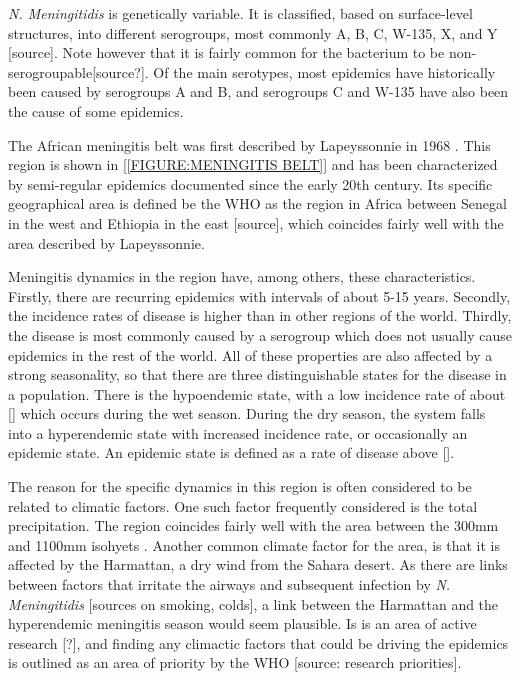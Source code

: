 \documentclass[10pt,a4paper]{article}
\begin{document}

\emph{N. Meningitidis} is genetically variable. It is classified, based on surface-level structures, into different serogroups, most commonly A, B, C, W-135, X, and Y [source]. Note however that it is fairly common for the bacterium to be non-serogroupable[source?]. Of the main serotypes, most epidemics have historically been caused by serogroups A and B, and serogroups C and W-135 have also been the cause of some epidemics. 


The African meningitis belt was first described by Lapeyssonnie in 1968 \cite{lapeyssonnie}. This region is shown in \cref{[FIGURE:MENINGITIS BELT]} and has been characterized by semi-regular epidemics documented since the early 20th century. Its specific geographical area is defined be the WHO as the region in Africa between Senegal in the west and Ethiopia in the east [source], which coincides fairly well with the area described by Lapeyssonnie.

Meningitis dynamics in the region have, among others, these characteristics. Firstly, there are recurring epidemics with intervals of about 5-15 years. Secondly, the incidence rates of disease is higher than in other regions of the world. Thirdly, the disease is most commonly caused by a serogroup which does not usually cause epidemics in the rest of the world. All of these properties are also affected by a strong seasonality, so that there are three distinguishable states for the disease in a population. There is the hypoendemic state, with a low incidence rate of about [] which occurs during the wet season. During the dry season, the system falls into a hyperendemic state with increased incidence rate, or occasionally an epidemic state. An epidemic state is defined as a rate of disease above []. \cite{mueller2010hypothetical}

The reason for the specific dynamics in this region is often considered to be related to climatic factors. One such factor frequently considered is the total precipitation. The region coincides fairly well with the area between the 300mm and 1100mm isohyets \cite{molesworth2002meningitis}. Another common climate factor for the area, is that it is affected by the Harmattan, a dry wind from the Sahara desert. As there are links between factors that irritate the airways and subsequent infection by \emph{N. Meningitidis} [sources on smoking, colds], a link between the Harmattan and the hyperendemic meningitis season would seem plausible. Is is an area of active research [?], and finding any climactic factors that could be driving the epidemics is outlined as an area of priority by the WHO [source: research priorities].
\end{document}
